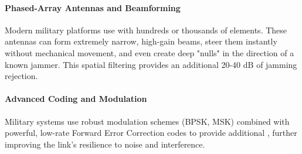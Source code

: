 \paragraph{Phased-Array Antennas and Beamforming}
Modern military platforms use  with hundreds or thousands of elements. These antennas can form extremely narrow, high-gain beams, steer them instantly without mechanical movement, and even create deep "nulls" in the direction of a known jammer. This spatial filtering provides an additional 20-40 dB of jamming rejection.

\paragraph{Advanced Coding and Modulation}
Military systems use robust modulation schemes (BPSK, MSK) combined with powerful, low-rate Forward Error Correction codes to provide additional , further improving the link's resilience to noise and interference.


